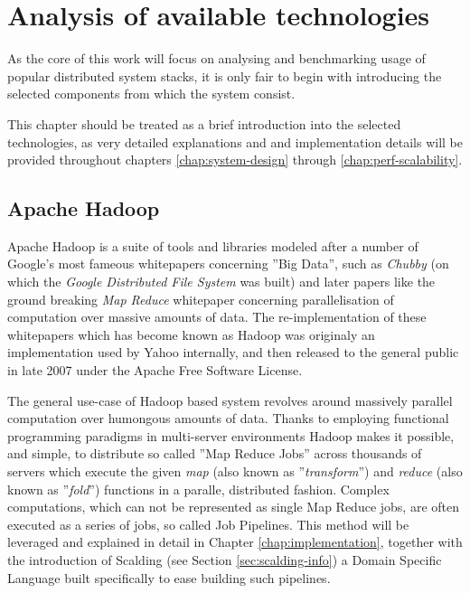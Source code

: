 \chapter{Analysis of available technologies}
As the core of this work will focus on analysing and benchmarking usage of popular distributed system stacks, it is only fair to begin with introducing the selected components from which the system consist.

This chapter should be treated as a brief introduction into the selected technologies, as very detailed explanations and and implementation details will be provided throughout chapters \ref{chap:system-design} through \ref{chap:perf-scalability}.

\section{Apache Hadoop}
\label{sec:hadoop}

Apache Hadoop is a suite of tools and libraries modeled after a number of Google's most fameous whitepapers concerning ''Big Data'', such as \textit{Chubby} \cite{chubby} (on which the \textit{Google Distributed File System} \cite{gfs} was built) and later papers like the ground breaking \textit{Map Reduce} \cite{map-reduce} whitepaper concerning parallelisation of computation over massive amounts of data.
The re-implementation of these whitepapers which has become known as Hadoop was originaly an implementation used by Yahoo \cite{yahoo} internally, and then released to the general public in late 2007 under the Apache Free Software License.

The general use-case of Hadoop based system revolves around massively parallel computation over humongous amounts of data. Thanks to employing functional programming paradigms in multi-server environments Hadoop makes it possible, and simple, to distribute so called ''Map Reduce Jobs'' across thousands of servers which execute the given \textit{map} (also known as ''\textit{transform}'') and \textit{reduce} (also known as ''\textit{fold}'') functions in a paralle, distributed fashion. Complex computations, which can not be represented as single Map Reduce jobs, are often executed as a series of jobs, so called Job Pipelines. This method will be leveraged and explained in detail in Chapter \ref{chap:implementation}, together with the introduction of Scalding (see Section \ref{sec:scalding-info}) a Domain Specific Language built specifically to ease building such pipelines.

